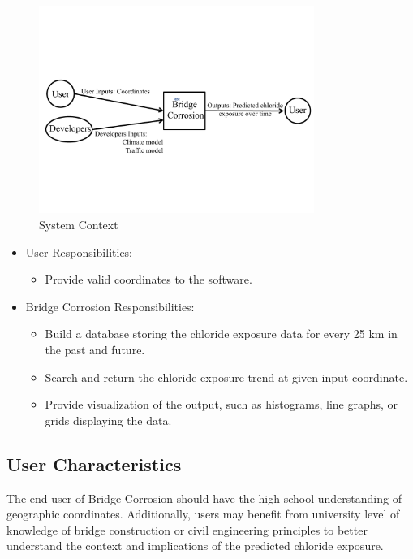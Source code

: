 \documentclass[12pt]{article}
\begin{document}
\begin{figure}[h!]
\begin{center}
 \includegraphics[width=0.8\textwidth]{SystemContextFigure}
\caption{System Context}
\label{Fig_SystemContext} 
\end{center}
\end{figure}

\begin{itemize}
\item User Responsibilities:
\begin{itemize}
\item Provide valid coordinates to the software.
\end{itemize}
\item Bridge Corrosion Responsibilities:
\begin{itemize}
\item Build a database storing the chloride exposure data for every 25 km in the past and future.
\item Search and return the chloride exposure trend at given input coordinate.
\item Provide visualization of the output, such as histograms, line graphs, or grids displaying the data.
\end{itemize}
\end{itemize}

\subsection{User Characteristics} \label{SecUserCharacteristics}
The end user of Bridge Corrosion should have the high school understanding of geographic coordinates. Additionally, users may benefit from university level of knowledge of bridge construction or civil engineering principles to better understand the context and implications of the predicted chloride exposure.
\end{document}
